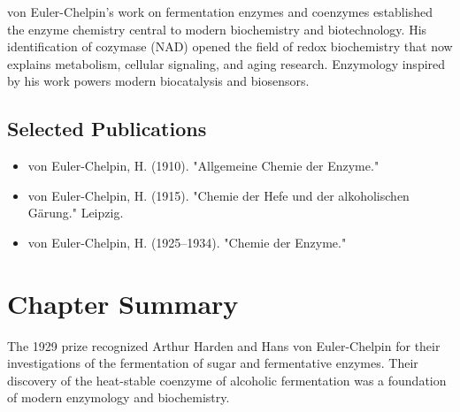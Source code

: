 von Euler-Chelpin's work on fermentation enzymes and coenzymes established the enzyme chemistry central to modern biochemistry and biotechnology. His identification of cozymase (NAD) opened the field of redox biochemistry that now explains metabolism, cellular signaling, and aging research. Enzymology inspired by his work powers modern biocatalysis and biosensors.

\subsection*{Selected Publications}

\begin{itemize}

\item von Euler-Chelpin, H. (1910). "Allgemeine Chemie der Enzyme."

\item von Euler-Chelpin, H. (1915). "Chemie der Hefe und der alkoholischen Gärung." Leipzig.

\item von Euler-Chelpin, H. (1925--1934). "Chemie der Enzyme."

\end{itemize}

\clearpage

\section*{Chapter Summary}

The 1929 prize recognized Arthur Harden and Hans von Euler-Chelpin for their investigations of the fermentation of sugar and fermentative enzymes. Their discovery of the heat-stable coenzyme of alcoholic fermentation was a foundation of modern enzymology and biochemistry.
